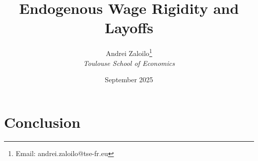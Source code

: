 \documentclass[12pt]{article}
\title{Endogenous Wage Rigidity and Layoffs}
\author{Andrei Zaloilo\footnote{Email: andrei.zaloilo@tse-fr.eu} \\ \textit{Toulouse School of Economics} }
\date{September 2025}
\begin{document}
\maketitle







%





\section{Conclusion}
\end{document}

